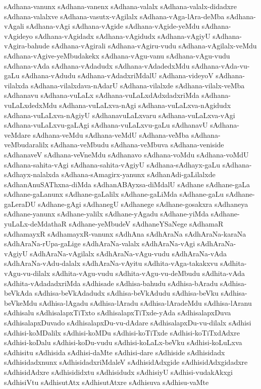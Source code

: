 {sAdhana-vanunx
sAdhana-vanenx
sAdhana-valalx
sAdhana-valalx-didadxre
sAdhana-valalxve
sAdhana-vasutx-vAgilalx
sAdhana-vAga-lAra-deMba
sAdhana-vAgali
sAdhana-vAgi
sAdhana-vAgide
sAdhana-vAgide-yeMdu
sAdhana-vAgideyo
sAdhana-vAgidadx
sAdhana-vAgidudx
sAdhana-vAgiyU
sAdhana-vAgira-bahude
sAdhana-vAgirali
sAdhana-vAgiru-vudu
sAdhana-vAgilalx-veMdu
sAdhana-vAgive-yeMbudakekx
sAdhana-vAgu-vanu
sAdhana-vAgu-vudu
sAdhana-vAda
sAdhana-vAdadudx
sAdhana-vAdadedxMdu
sAdhana-vAda-vu-gaLu
sAdhana-vAdudu
sAdhana-vAdadxriMdalU
sAdhana-videyoV
sAdhana-vilalxda
sAdhana-vilalxdava-nAdarU
sAdhana-vilalxde
sAdhana-vilalx-veMba
sAdhanavu
sAdhana-vuLaLx
sAdhana-vuLaLxdAdxdadxriMda
sAdhana-vuLaLxdedxMdu
sAdhana-vuLaLxva-nAgi
sAdhana-vuLaLxva-nAgidudx
sAdhana-vuLaLxva-nAgiyU
sAdhanavuLaLxvaru
sAdhana-vuLaLxva-vAgi
sAdhana-vuLaLxvu-gaLAgi
sAdhana-vuLaLxvu-gaLu
sAdhanavU
sAdhana-veMdare
sAdhana-veMdu
sAdhana-veMdU
sAdhana-veMba
sAdhana-veMbudaralilx
sAdhana-veMbudu
sAdhana-veMbuva
sAdhana-veniside
sAdhanaveV
sAdhana-veVneMdu
sAdhanavo
sAdhana-voMdu
sAdhana-voMdU
sAdhana-sahita-vAgi
sAdhana-sahita-vAgiyU
sAdhana-sAdhayx-gaLu
sAdhana-sAdhayx-nalalxda
sAdhana-sAmagirx-yanunx
sAdhanAdi-gaLilalxde
sAdhanAnuSAThxna-diMda
sAdhanABAyxsa-diMdalU
sAdhane
sAdhane-gaLa
sAdhane-gaLanunx
sAdhane-gaLalilx
sAdhane-gaLiMda
sAdhane-gaLu
sAdhane-gaLeraDU
sAdhane-gAgi
sAdhanegU
sAdhanege
sAdhane-gosakxra
sAdhaneya
sAdhane-yanunx
sAdhane-yalilx
sAdhane-yAgadu
sAdhane-yiMda
sAdhane-yuLaLx-deMdathaR
sAdhane-yeMbudeV
sAdhaneYSaNege
sAdhamaR
sAdhamayxR
sAdhamayxR-vanunx
sAdhAna
sAdhAraNa
sAdhAraNa-karaNa
sAdhAraNa-rUpa-gaLige
sAdhAraNa-valalx
sAdhAraNa-vAgi
sAdhAraNa-vAgiyU
sAdhAraNa-vAgilalx
sAdhAraNa-vAgu-vudu
sAdhAraNa-vAda
sAdhAraNa-vAdu-dalalx
sAdhAraNa-vAyitu
sAdhita-vAga-takakxvu
sAdhita-vAgu-vu-dilalx
sAdhita-vAgu-vudu
sAdhita-vAgu-vu-deMbudu
sAdhita-vAda
sAdhita-vAdadadxriMda
sAdhisade
sAdhisa-bahudu
sAdhisa-bAradu
sAdhisa-beVkAda
sAdhisa-beVkAdadudx
sAdhisa-beVkAdudu
sAdhisa-beVku
sAdhisa-beVkeMdu
sAdhisa-lAgadu
sAdhisa-lAradu
sAdhisa-lAradeMdu
sAdhisa-lAranu
sAdhisalu
sAdhisalapxTiTxto
sAdhisalapxTiTxde-yAda
sAdhisalapxDuva
sAdhisalapxDuvado
sAdhisalapxDu-vu-dAdare
sAdhisalapxDu-vu-dilalx
sAdhisi
sAdhisi-koMDalilx
sAdhisi-koMDu
sAdhisi-koTiTxde
sAdhisi-koTiTxdAdxre
sAdhisi-koDalu
sAdhisi-koDu-vudu
sAdhisi-koLaLx-beVku
sAdhisi-koLuLxva
sAdhisitu
sAdhisida
sAdhisi-daMte
sAdhisi-dare
sAdhiside
sAdhisidadx
sAdhisidadxnunx
sAdhisidadxriMdaleV
sAdhisidAdxgide
sAdhisidAdxgidadxre
sAdhisidAdxre
sAdhisididxtu
sAdhisidudx
sAdhisiyU
sAdhisi-vudakAkxgi
sAdhisiVtu
sAdhisutAtx
sAdhisutAtxre
sAdhisuva
sAdhisu-vaMte
}

